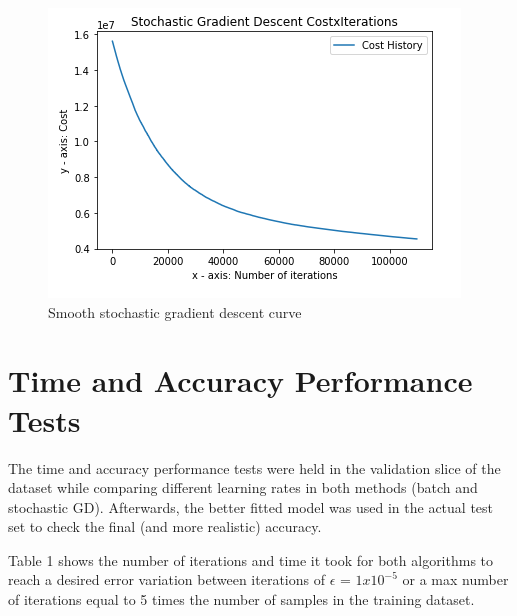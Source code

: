 \documentclass[conference]{IEEEtran}
\begin{document}
  \begin{figure}[!h]
      \centering
      \includegraphics[width=1\columnwidth]{images/smoother-curves-in-stochastic-gd.png}
      \caption{Smooth stochastic gradient descent curve}
      \label{fig2}
  \end{figure}
	
\section{Time and Accuracy Performance Tests}

	The time and accuracy performance tests were held in the validation slice of the dataset while comparing different learning rates in both methods (batch and stochastic GD). Afterwards, the better fitted model was used in the actual test set to check the final (and more realistic) accuracy.
	
	Table 1 shows the number of iterations and time it took for both algorithms to reach a desired error variation between iterations of $\epsilon$  = $1x10^{-5}$ or a max number of iterations equal to 5 times the number of samples in the training dataset.
	
\end{document}
